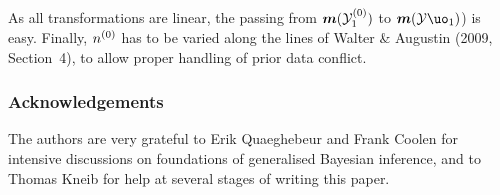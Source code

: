 As all transformations are linear, the passing from $\boldsymbol{m}({\cal Y}^{(0)}_1)$ to $\bs{m}({\cal Y}\uo_1)$) is easy.
Finally, $n^{(0)}$ has to be varied along the lines of Walter \& Augustin (2009, Section~4), to allow proper handling of prior data conflict.
\fi

\subsubsection*{Acknowledgements}

The authors are very grateful to Erik Quaeghebeur and Frank Coolen for intensive discussions on foundations of generalised Bayesian
inference, and to Thomas Kneib for help at several stages of writing this paper.



